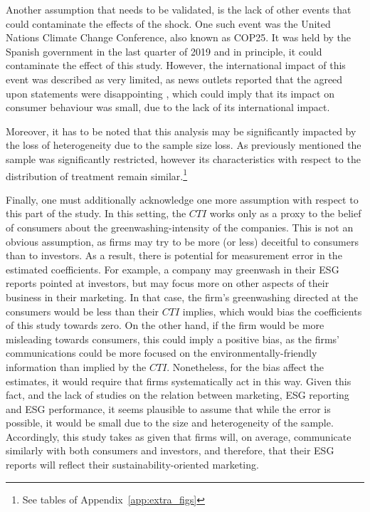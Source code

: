 \documentclass[12pt]{article}
\begin{document}
Another assumption that needs to be validated, is the lack of other events that could contaminate the effects of the shock. One such event was the United Nations Climate Change Conference, also known as COP25. It was held by the Spanish government in the last quarter of 2019 and in principle, it could contaminate the effect of this study. However, the international impact of this event was described as very limited, as news outlets reported that the agreed upon statements were disappointing \parencite{SenguptaCOP252019}, which could imply that its impact on consumer behaviour was small, due to the lack of its international impact.

Moreover, it has to be noted that this analysis may be significantly impacted by the loss of heterogeneity due to the sample size loss. As previously mentioned the sample was significantly restricted, however its characteristics with respect to the distribution of treatment remain similar.\footnote{See tables of Appendix~\ref{app:extra_figs}}    

Finally, one must additionally acknowledge one more assumption with respect to this part of the study. In this setting, the $CTI$ works only as a proxy to the belief of consumers about the greenwashing-intensity of the companies. This is not an obvious assumption, as firms may try to be more (or less) deceitful to consumers than to investors. As a result, there is potential for  measurement error in the estimated coefficients. For example, a company may greenwash in their ESG reports pointed at investors, but may focus more on other aspects of their business in their marketing. In that case, the firm's greenwashing directed at the consumers would be less than their $CTI$ implies, which would bias the coefficients of this study towards zero. On the other hand, if the firm would be more misleading towards consumers, this could imply a positive bias, as the firms' communications could be more focused on the environmentally-friendly information than implied by the $CTI$. Nonetheless, for the bias affect the estimates, it would require that firms systematically act in this way. Given this fact, and the lack of studies on the relation between marketing, ESG reporting and ESG performance, it seems plausible to assume that while the error is possible, it would be small due to the size and heterogeneity of the sample. Accordingly, this study takes as given that firms will, on average, communicate similarly with both consumers and investors, and therefore, that their ESG reports will reflect their sustainability-oriented marketing. 
\end{document}
